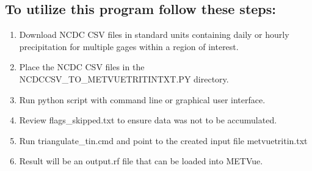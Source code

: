 \documentclass[11pt]{article} %
\begin{document}
\subsection{To utilize this program follow these steps:}
\begin{enumerate}
\item Download NCDC CSV files in standard units containing daily or hourly precipitation for multiple gages within a region of interest.  
\item Place the NCDC CSV files in the NCDCCSV\_TO\_METVUETRITINTXT.PY directory.
\item Run python script with command line or graphical user interface.
\item Review flags\_skipped.txt to ensure data was not to be accumulated.
\item Run triangulate\_tin.cmd and point to the created input file metvuetritin.txt
\item Result will be an output.rf file that can be loaded into METVue.
\end{enumerate}
\end{document}
